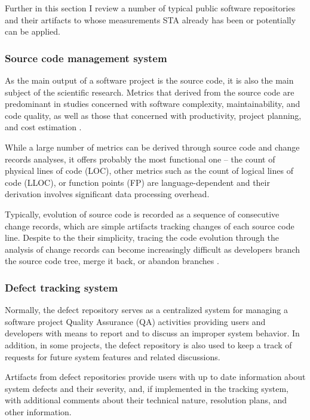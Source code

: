 Further in this section I review a number of typical public software repositories and their artifacts to whose measurements 
STA already has been or potentially can be applied. 

\subsubsection{Source code management system}
As the main output of a software project is the source code, it is also the main subject of the scientific research. 
Metrics that derived from the source code are predominant in studies concerned with software complexity, maintainability,
and code quality, as well as those that concerned with productivity, project planning, and cost estimation \cite{citeulike:4534888}. 

While a large number of metrics can be derived through source code and change records analyses, it offers probably 
the most functional one -- the count of physical lines of code (LOC), other metrics such as the count of logical lines of 
code (LLOC), or function points (FP) are language-dependent and their derivation involves significant data processing overhead.

Typically, evolution of source code is recorded as a sequence of consecutive change records, which are simple artifacts 
tracking changes of each source code line. Despite to the their simplicity, tracing the code evolution through the analysis 
of change records can become increasingly difficult as developers branch the source code tree, merge it back, or abandon 
branches \cite{citeulike:13156191}.

\subsubsection{Defect tracking system}
Normally, the defect repository serves as a centralized system for managing a software project Quality Assurance (QA) activities
providing users and developers with means to report and to discuss an improper system behavior.
In addition, in some projects, the defect repository is also used to keep a track of requests for future system features and related
discussions.

Artifacts from defect repositories provide users with up to date information about system defects and their severity, and, 
if implemented in the tracking system, with additional comments about their technical nature, resolution plans, and other information. 


